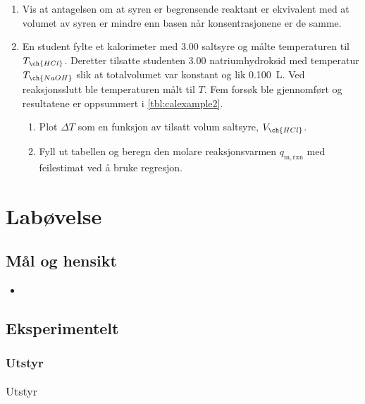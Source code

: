\begin{enumerate}[label=\alph*)]
		\item Vis at antagelsen om at syren er begrensende reaktant er ekvivalent med at volumet av syren er mindre enn basen når konsentrasjonene er de samme.
		
		\item En student fylte et kalorimeter med \SI{3.00}{\molar} saltsyre og målte temperaturen til $T_{\ch{HCl}}$.
		Deretter tilsatte studenten \SI{3.00}{\molar} natriumhydroksid med temperatur $T_{\ch{NaOH}}$ slik at totalvolumet var konstant og lik \SI{0.100}{\liter}.
		Ved reaksjonsslutt ble temperaturen målt til $T$.
		Fem forsøk ble gjennomført og resultatene er oppsummert i \cref{tbl:calexample2}.
		\begin{enumerate}[label=\roman*)]
			\item Plot $\Delta T$ som en funksjon av tilsatt volum saltsyre, $V_{\ch{HCl}}$.
			\item Fyll ut tabellen og beregn den molare reaksjonsvarmen $q_\mathrm{m, rxn}$ med feilestimat ved å bruke regresjon.
		\end{enumerate}	
	\end{enumerate}
	
	\clearpage
	\section{Labøvelse}
	
	\subsection{Mål og hensikt}
	\begin{itemize}
		\item 
	\end{itemize}
	
	\subsection{Eksperimentelt}
	
	\subsubsection{Utstyr}
	
	\begin{table}[H]
		\caption{Utstyr}
		\begin{tabular}{ll}
			\toprule
			& \\ \bottomrule 
		\end{tabular}
		\label{equipment}
	\end{table}
	
